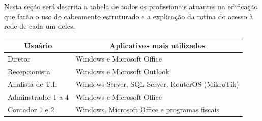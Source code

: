 \documentclass[	DIV=calc,%
							paper=a4,%
							fontsize=12pt,%
							onecolumn]{scrartcl}	 					%
\begin{document}
Nesta seção será descrita a tabela de todos os profissionais atuantes na edificação que farão o uso do cabeamento estruturado e a explicação da rotina do acesso à rede de cada um deles.


\begin{table}[H]
	\centering
	\renewcommand{\arraystretch}{2.0}
	\begin{tabular}{|l|l|}
		\hline
		\multicolumn{1}{|c|}{\textbf{Usuário}} &	 \multicolumn{1}{|c|}{\textbf{Aplicativos mais utilizados}}                                 		  \\ \hline		Diretor                                
		& Windows e Microsoft Office                                              \\ \hline
		Recepcionista                               
		& Windows e Microsoft Outlook            					\\ \hline
		Analista de T.I.                                  
		& Windows Server, SQL Server, RouterOS (MikroTik)          \\ \hline
		Adminstrador 1 a 4 
		& Windows e Microsoft Office         \\ \hline
		Contador 1 e 2                                  
		& Windows, Microsoft Office e programas fiscais    \\ \hline
	\end{tabular}
\end{table}

\end{document}
